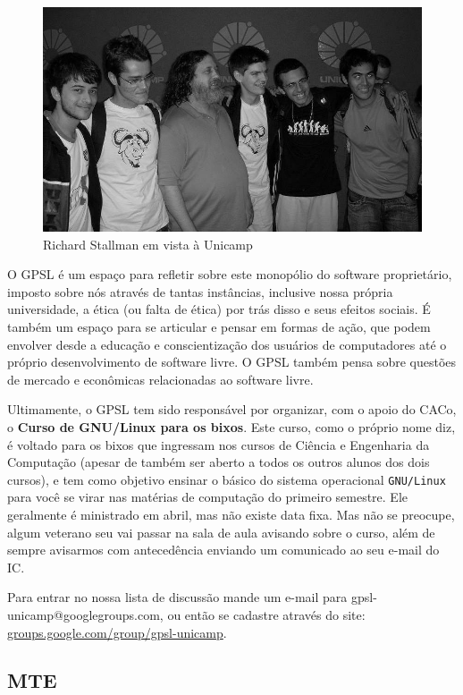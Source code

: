 \begin{figure}[h!]
    \centering
    \includegraphics[scale=0.36, keepaspectratio=true]{img/imgs/18-grupos_entidades/stallman2.JPG}
    \caption{Richard Stallman em vista à Unicamp}
\end{figure}

O GPSL é um espaço para refletir sobre este monopólio do software proprietário,
imposto sobre nós através de tantas instâncias, inclusive nossa própria
universidade, a ética (ou falta de ética) por trás disso e seus efeitos sociais.
É também um espaço para se articular e pensar em formas de ação, que podem
envolver desde a educação e conscientização dos usuários de computadores até
o próprio desenvolvimento de software livre. O GPSL também pensa sobre
questões de mercado e econômicas relacionadas ao software livre.

Ultimamente, o GPSL tem sido responsável por organizar, com o apoio do
CACo, o \textbf{Curso de GNU/Linux para os bixos}. Este curso, como o
próprio nome diz, é voltado para os bixos que ingressam nos cursos de
Ciência e Engenharia da Computação (apesar de também ser aberto a todos
os outros alunos dos dois cursos), e tem como objetivo ensinar o
básico do sistema operacional \texttt{GNU/Linux} para você se virar
nas matérias de computação do primeiro semestre. Ele geralmente é
ministrado em abril, mas não existe data fixa. Mas não se preocupe,
algum veterano seu vai passar na sala de aula avisando sobre o curso,
além de sempre avisarmos com antecedência enviando um comunicado ao
seu e-mail do IC.

Para entrar no nossa lista de discussão mande um e-mail para
gpsl-unicamp@googlegroups.com, ou então se cadastre através do site:
\url{groups.google.com/group/gpsl-unicamp}.

\subsection{MTE}

